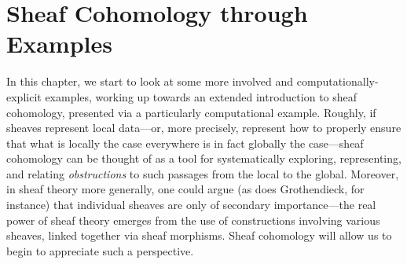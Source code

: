 \documentclass[a4paper]{book}
\theoremstyle{definition}
\theoremstyle{definition}
\theoremstyle{definition}
\theoremstyle{theorem}
\theoremstyle{definition}
\begin{document}
\chapter{Sheaf Cohomology through Examples} 
In this chapter, we start to look at some more involved and computationally-explicit examples, working up towards an extended introduction to sheaf cohomology, presented via a particularly computational example. Roughly, if sheaves represent local data---or, more precisely, represent how to properly ensure that what is locally the case everywhere is in fact globally the case---sheaf cohomology can be thought of as a tool for systematically exploring, representing, and relating \textit{obstructions} to such passages from the local to the global. Moreover, in sheaf theory more generally, one could argue (as does Grothendieck, for instance) that individual sheaves are only of secondary importance---the real power of sheaf theory emerges from the use of constructions involving various sheaves, linked together via sheaf morphisms. Sheaf cohomology will allow us to begin to appreciate such a perspective. 
\end{document}

